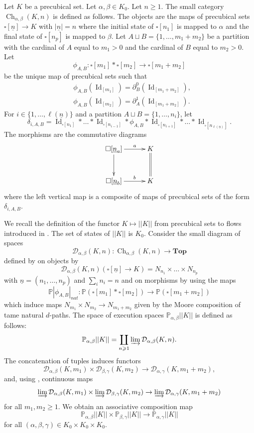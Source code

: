 \documentclass[a4paper,12pt]{amsart}
\makeatletter
\newcommand{\D}{\mathcal{D}}
\newcommand{\de}{\partial}
\newcommand{\p}{\times}
\renewcommand{\P}{\mathbb{P}}
\theoremstyle{definition}
\newcommand{\fr}[1]{\ar@{->}[r]^-{#1}}
\newcommand{\fd}[1]{\ar@{->}[d]_-{#1}}
\renewcommand{\top}{{\mathbf{Top}}}
\renewcommand{\geq}{\geqslant}
\DeclareMathOperator{\id}{Id}
\DeclareMathOperator{\Ch}{Ch}
\newcommand{\liminj}{\varinjlim}
\renewcommand{\P}{\mathbb{P}}
\makeatother
\begin{document}
Let $K$ be a precubical set. Let $\alpha,\beta\in K_0$. Let $n\geq 1$. The small category $\Ch_{\alpha,\beta}(K,n)$ is defined as follows. The objects are the maps of precubical sets $\square[\underline{n}] \to K$ with $|\underline{n}|=n$ where the initial state of $\square[n_1]$ is mapped to $\alpha$ and the final state of $\square[n_p]$ is mapped to $\beta$. Let $A\sqcup B=\{1,\dots,m_1+m_2\}$ be a partition with the cardinal of $A$ equal to $m_1>0$ and the cardinal of $B$ equal to $m_2>0$. Let \[\phi_{A,B}:\square[m_1]*\square[m_2] \longrightarrow \square[m_1+m_2]\] be the unique map of precubical sets such that 
\begin{align*}
	&\phi_{A,B}(\id_{[m_1]}) = \de^0_B(\id_{[m_1+m_2]}),\\
	&\phi_{A,B}(\id_{[m_2]}) = \de^1_A(\id_{[m_1+m_2]}).
\end{align*}
For $i\in \{1,\dots,\ell(\underline{n})\}$ and a partition $A\sqcup B=\{1,\dots,n_i\}$, let \[\delta_{i,A,B}=\id_{\square[n_1]}*\dots*\id_{\square[n_{i-1}]}*\phi_{A,B}*\id_{\square[n_{i+1}]}*\dots*\id_{\square[n_{\ell(\underline{n})}]}.\] The morphisms are the commutative diagrams
\[
\xymatrix@C=3em@R=3em
{
	\square[\underline{n}_a] \fd{}\fr{a} & K \ar@{=}[d] \\
	\square[\underline{n}_b]  \fr{b}  & K
}
\] 
where the left vertical map is a composite of maps of precubical sets of the form $\delta_{i,A,B}$. 

We recall the definition of the functor $K\mapsto ||K||$ from precubical sets to flows introduced in \cite[Section~6]{NaturalRealization}. The set of states of $||K||$ is $K_0$. Consider the small diagram of spaces \[\D_{\alpha,\beta}(K,n):\Ch_{\alpha,\beta}(K,n)\longrightarrow \top\] defined by on objects by \[\D_{\alpha,\beta}(K,n)(\square[\underline{n}]\to K) = N_{n_1} \p \dots \p N_{n_p}\] with $\underline{n} = (n_1,\dots,n_p)$ and $\sum_i n_i=n$ and on morphisms by using the maps \[\P|\phi_{A,B}|_{nat}:\P(\square[m_1]*\square[m_2]) \to \P(\square[m_1+m_2])\] which induce maps $N_{m_1}\p N_{m_2}\to N_{m_1+m_2}$ given by the Moore composition of tame natural $d$-paths. The space of execution spaces $\P_{\alpha,\beta} ||K||$ is defined as follows:
\[
\P_{\alpha,\beta} ||K|| = \displaystyle\coprod_{n\geq 1} \liminj \D_{\alpha,\beta}(K,n).
\]
The concatenation of tuples induces functors \[\D_{\alpha,\beta}(K,m_1)\p \D_{\beta,\gamma}(K,m_2) \to \D_{\alpha,\gamma}(K,m_1+m_2),\]
and, using \cite[Proposition~A.4]{leftproperflow}, continuous maps 
\[\liminj \D_{\alpha,\beta}(K,m_1)\p \liminj \D_{\beta,\gamma}(K,m_2) \to \liminj\D_{\alpha,\gamma}(K,m_1+m_2)\] for all $m_1,m_2\geq 1$. We obtain an associative composition map \[\P_{\alpha,\beta} ||K|| \p \P_{\beta,\gamma} ||K|| \to \P_{\alpha,\gamma} ||K||\] for all $(\alpha,\beta,\gamma)\in K_0\p K_0\p K_0$.
\end{document}
